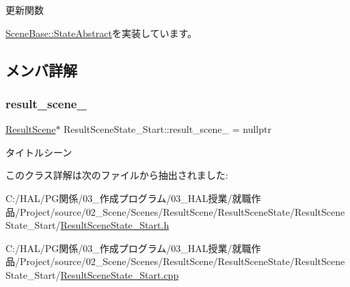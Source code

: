 更新関数 



\mbox{\hyperlink{class_scene_base_1_1_state_abstract_a7fca4c5e7d0174af8a147c404f4e6eee}{Scene\+Base\+::\+State\+Abstract}}を実装しています。



\subsection{メンバ詳解}
\mbox{\label{class_result_scene_state___start_a223a52e93231e460dad3401a1a49931d}} 
\subsubsection{\texorpdfstring{result\+\_\+scene\+\_\+}{result\_scene\_}}
{\footnotesize\ttfamily \mbox{\hyperlink{class_result_scene}{Result\+Scene}}$\ast$ Result\+Scene\+State\+\_\+\+Start\+::result\+\_\+scene\+\_\+ = nullptr\hspace{0.3cm}{\ttfamily [protected]}}



タイトルシーン 



このクラス詳解は次のファイルから抽出されました\+:\begin{DoxyCompactItemize}
\item 
C\+:/\+H\+A\+L/\+P\+G関係/03\+\_\+作成プログラム/03\+\_\+\+H\+A\+L授業/就職作品/\+Project/source/02\+\_\+\+Scene/\+Scenes/\+Result\+Scene/\+Result\+Scene\+State/\+Result\+Scene\+State\+\_\+\+Start/\mbox{\hyperlink{_result_scene_state___start_8h}{Result\+Scene\+State\+\_\+\+Start.\+h}}\item 
C\+:/\+H\+A\+L/\+P\+G関係/03\+\_\+作成プログラム/03\+\_\+\+H\+A\+L授業/就職作品/\+Project/source/02\+\_\+\+Scene/\+Scenes/\+Result\+Scene/\+Result\+Scene\+State/\+Result\+Scene\+State\+\_\+\+Start/\mbox{\hyperlink{_result_scene_state___start_8cpp}{Result\+Scene\+State\+\_\+\+Start.\+cpp}}\end{DoxyCompactItemize}
